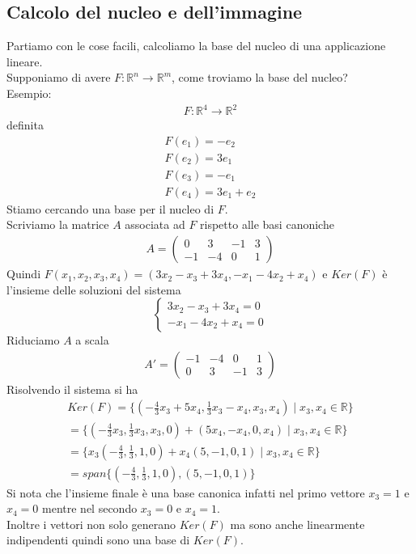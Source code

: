 \documentclass{article}
\begin{document}
\subsection{Calcolo del nucleo e dell'immagine}
Partiamo con le cose facili, calcoliamo la base del nucleo di una applicazione lineare. 
\\Supponiamo di avere $F : \mathbb{R}^n \to \mathbb{R}^m$, come troviamo la base del nucleo?
\\Esempio:
\begin{align*}
  F : \mathbb{R}^4\to\mathbb{R}^2
\end{align*}
definita
\begin{align*}
  F(e_1)=-e_2 \\
  F(e_2)=3e_1 \\
  F(e_3)=-e_1 \\
  F(e_4)=3e_1+e_2
\end{align*}
Stiamo cercando una base per il nucleo di $F$.
\\Scriviamo la matrice $A$ associata ad $F$ rispetto alle basi canoniche
\begin{align*}
  A=\begin{pmatrix}
    0 & 3 & -1 & 3 \\
    -1 & -4 & 0 & 1
  \end{pmatrix}
\end{align*}
Quindi $F(x_1,x_2,x_3,x_4)=(3x_2-x_3+3x_4, -x_1-4x_2+x_4)$ e $Ker(F)$ è l'insieme delle soluzioni del sistema
\begin{equation*}
  \left\{
  \begin{aligned}
    3x_2-x_3+3x_4=0 \\
    -x_1-4x_2+x_4=0
  \end{aligned}
  \right.
\end{equation*}
Riduciamo $A$ a scala 
\begin{align*}
  A'=\begin{pmatrix}
    -1 & -4 & 0 & 1 \\
    0 & 3 & -1 & 3 
  \end{pmatrix}
\end{align*}
Risolvendo il sistema si ha
\begin{align*}
  Ker(F)=\{(-\frac{4}{3}x_3+5x_4,\frac{1}{3}x_3-x_4,x_3,x_4) \mid x_3,x_4 \in \mathbb{R}\} \\
  = \{(-\frac{4}{3}x_3,\frac{1}{3}x_3,x_3,0)+(5x_4,-x_4,0,x_4) \mid x_3,x_4 \in \mathbb{R}\} \\
  = \{x_3(-\frac{4}{3},\frac{1}{3},1,0)+x_4(5,-1,0,1) \mid x_3,x_4 \in \mathbb{R}\} \\
  = span\{(-\frac{4}{3},\frac{1}{3},1,0),(5,-1,0,1)\} 
\end{align*}
Si nota che l'insieme finale è una base canonica infatti nel primo vettore $x_3=1$ e $x_4=0$ mentre nel secondo $x_3=0$ e $x_4=1$.
\\Inoltre i vettori non solo generano $Ker(F)$ ma sono anche linearmente indipendenti quindi sono una base di $Ker(F)$.
\end{document}
